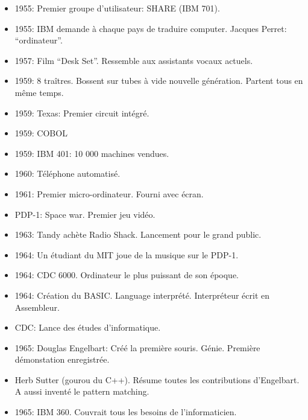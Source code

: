 \documentclass[a4paper,11pt]{article}
\begin{document}
\begin{itemize}
\item 1955: Premier groupe d'utilisateur: SHARE (IBM 701).

\item 1955: IBM demande à chaque pays de traduire computer. Jacques Perret: ``ordinateur''.

\item 1957: Film ``Desk Set''. Ressemble aux assistants vocaux actuels.

\item 1959: 8 traîtres. Bossent sur tubes à vide nouvelle génération. Partent
  tous en même temps.

\item 1959: Texas: Premier circuit intégré.

\item 1959: COBOL

\item 1959: IBM 401: 10 000 machines vendues.

\item 1960: Téléphone automatisé.

\item 1961: Premier micro-ordinateur. Fourni avec écran.

\item PDP-1: Space war. Premier jeu vidéo.

\item 1963: Tandy achète Radio Shack. Lancement pour le grand public.

\item 1964: Un étudiant du MIT joue de la musique sur le PDP-1.

\item 1964: CDC 6000. Ordinateur le plus puissant de son époque.

\item 1964: Création du BASIC. Language interprété. Interpréteur écrit en
  Assembleur.

\item CDC: Lance des études d'informatique.

\item 1965: Douglas Engelbart: Créé la première souris. Génie. Première
  démonstation enregistrée.

\item Herb Sutter (gourou du C++). Résume toutes les contributions d'Engelbart.
  A aussi inventé le pattern matching.

\item 1965: IBM 360. Couvrait tous les besoins de l'informaticien.


\end{itemize}
\end{document}
